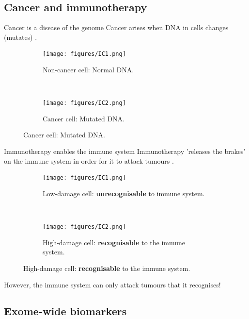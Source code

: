 \documentclass{beamer}
\begin{document}
\subsection{Cancer and immunotherapy}
\begin{frame}{Cancer is a disease of the genome}
Cancer arises when DNA in cells changes (mutates) \citep{hanahan_hallmarks_2011}.
\begin{figure}[t!]
    \centering
    \begin{subfigure}[t]{0.45\textwidth}
        \centering
        \texttt{[image: figures/IC1.png]}
        \caption{Non-cancer cell: Normal DNA.}
    \end{subfigure}
    ~ 
    \begin{subfigure}[t]{0.45\textwidth}
        \centering
        \texttt{[image: figures/IC2.png]}
        \caption{Cancer cell: Mutated DNA.}
    \end{subfigure}
\end{figure}
\end{frame}
\begin{frame}{Immunotherapy enables the immune system}
Immunotherapy 'releases the brakes' on the immune system in order for it to attack tumours \citep{pardoll_blockade_2012}.
\begin{figure}[t!]
    \centering
    \begin{subfigure}[t]{0.45\textwidth}
        \centering
        \texttt{[image: figures/IC1.png]}
        \caption{Low-damage cell: \textbf{unrecognisable} to immune system.}
    \end{subfigure}
    ~ 
    \begin{subfigure}[t]{0.45\textwidth}
        \centering
        \texttt{[image: figures/IC2.png]}
        \caption{High-damage cell: \textbf{recognisable} to the immune system.}
    \end{subfigure}
\end{figure}
However, the immune system can only attack tumours that it recognises!
\end{frame}

\subsection{Exome-wide biomarkers}
\end{document}
